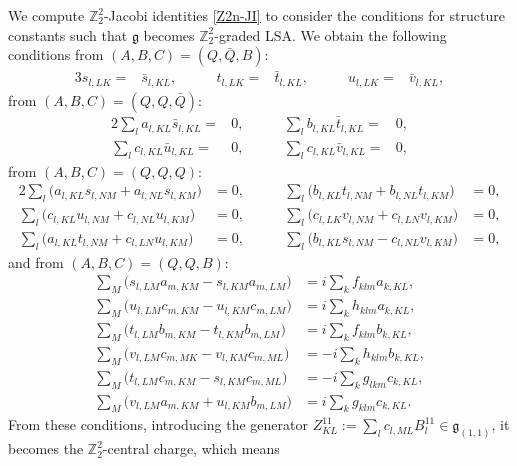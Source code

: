 \documentclass[a4paper,12pt]{article}
\def\nn{\nonumber}
\def\Z{\mathbb{Z}}
\def\g{\mathfrak{g}}
\theoremstyle{plain}
\theoremstyle{definition}
\begin{document}
We compute $\Z_2^2$-Jacobi identities \eqref{Z2n-JI} to consider the conditions for structure constants such that $\g$ becomes $\Z_2^2$-graded LSA. 
We obtain the following conditions
from $(A,B,C)=(Q,\bar Q, B)$:
\begin{alignat}{3}
 s_{l,LK}=&\bar s_{l,KL},\qquad&  t_{l,LK}=&\bar t_{l,KL},\qquad&  u_{l,LK}=&\bar v_{l,KL},
\end{alignat}
from $(A,B,C)=(Q,Q,\bar Q)$:
\begin{alignat}{2}
\sum_l a_{l,KL}\bar s_{l,KL}=&0
,\qquad& 
\sum_l b_{l,KL}\bar t_{l,KL}=&0
,\nn\\ 
\sum_l c_{l,KL}\bar u_{l,KL}=&0
,\qquad& 
\sum_l c_{l,KL}\bar v_{l,KL}=&0
,\label{JfQQQd}
\end{alignat}
from $(A,B,C)=(Q,Q,Q)$:
\begin{alignat}{2}
\sum_{l} \big( a_{l,KL}s_{l,NM} + a_{l,NL}s_{l,KM} \big) &= 0
,\qquad&
\sum_{l} \big( b_{l,KL}t_{l,NM} + b_{l,NL}t_{l,KM} \big) &= 0
,\nn\\
\sum_{l} \big( c_{l,KL}u_{l,NM} + c_{l,NL}u_{l,KM} \big) &= 0
,\qquad&
\sum_{l} \big( c_{l,LK}v_{l,NM} + c_{l,LN}v_{l,KM} \big) &= 0
,\nn\\
\sum_{l} \big( a_{l,KL}t_{l,NM} + c_{l,LN}u_{l,KM} \big) &= 0
,\qquad&
\sum_{l} \big( b_{l,KL}s_{l,NM} - c_{l,NL}v_{l,KM} \big) &= 0
,\label{JfQQQ}
\end{alignat}
and from $(A,B,C)=(Q,Q,B)$:
\begin{align}
 \sum_M \big( s_{l,LM}a_{m,KM}- s_{l,KM}a_{m,LM} \big) &= i\sum_k f_{klm}a_{k,KL}
,\nn\\
 \sum_M \big( u_{l,LM}c_{m,KM}- u_{l,KM}c_{m,LM} \big) &= i\sum_k h_{klm}a_{k,KL}
,\nn\\
 \sum_M \big( t_{l,LM}b_{m,KM}- t_{l,KM}b_{m,LM} \big) &= i\sum_k f_{klm}b_{k,KL}
,\nn\\
 \sum_M \big( v_{l,LM}c_{m,MK}- v_{l,KM}c_{m,ML} \big) &= -i\sum_k h_{klm}b_{k,KL}
,\nn\\
 \sum_M \big( t_{l,LM}c_{m,KM}- s_{l,KM}c_{m,ML} \big) &= -i\sum_k g_{lkm}c_{k,KL}
,\nn\\
 \sum_M \big( v_{l,LM}a_{m,KM}+ u_{l,KM}b_{m,LM} \big) &= i\sum_k g_{klm}c_{k,KL}
.\label{JfQQB}
\end{align}
From these conditions, introducing the generator $Z^{11}_{KL}:=\sum_l c_{l,ML}B^{11}_l\in \g_{(1,1)}$, it becomes the $\Z_2^2$-central charge, which means
\end{document}
